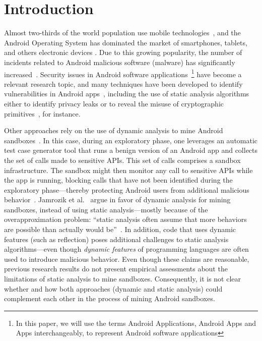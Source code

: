 \section{Introduction}\label{sec:introduction}

Almost two-thirds of the world population use mobile technologies~\cite{Comscore}, and the Android Operating System has dominated the market of smartphones, tablets, and others electronic devices \cite{statcounter}. Due to this growing popularity, the number of incidents related to Android malicious software (malware) has significantly increased~\cite{DBLP:journals/comsur/FarukiBLGGCR15,DBLP:journals/csur/SufatrioTCT15}. Security issues in Android software applications~\footnote{In this paper, we will use the terms Android Applications, Android Apps and Apps interchangeably, to represent Android software applications} have become a relevant research topic, and many techniques have been developed to identify vulnerabilities in Android apps~\cite{DBLP:conf/pldi/ArztRFBBKTOM14}, including the use of static analysis algorithms either to identify privacy leaks or to reveal the misuse of cryptographic primitives~\cite{krueger:ecoop-2018,rahaman:ccs-2019}, for instance.

Other approaches rely on the use of dynamic analysis to mine Android sandboxes~\cite{DBLP:conf/icse/JamrozikSZ16}. In this case, during an exploratory phase, one leverages an automatic test case generator tool that runs a benign version of an Android app and collects the set of calls made to sensitive APIs. This set of calls comprises a sandbox infrastructure. The sandbox might then monitor any call to sensitive APIs while the app is running, blocking calls that have not been identified during the exploratory phase---thereby protecting Android users from additional malicious behavior~\cite{DBLP:conf/icse/JamrozikSZ16}.
Jamrozik et al.~\cite{DBLP:conf/icse/JamrozikSZ16} argue in favor of dynamic analysis for mining sandboxes, instead of using static analysis---mostly because of the overapproximation problem: ``static analysis often assume that more behaviors are possible than actually would be''~\cite{DBLP:conf/icse/JamrozikSZ16}. In addition, code that uses dynamic features (such as reflection) poses additional challenges to static analysis algorithms---even though \emph{dynamic features} of programming languages are often used to introduce malicious behavior. Even though these claims are reasonable, previous research results do not present empirical assessments about the limitations of static analysis to mine sandboxes. Consequently, it is not clear whether and how both approaches (dynamic and static analysis) could complement each other in the process of mining Android sandboxes.

